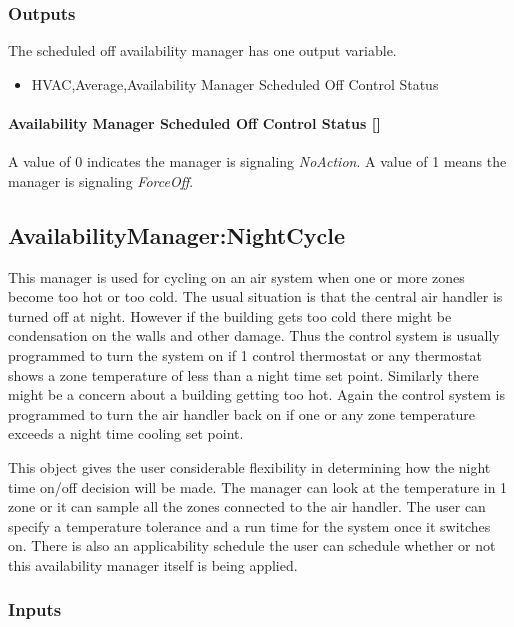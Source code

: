 \subsubsection{Outputs}\label{outputs-1-027}

The scheduled off availability manager has one output variable.

\begin{itemize}
\tightlist
\item
  HVAC,Average,Availability Manager Scheduled Off Control Status
\end{itemize}

\paragraph{Availability Manager Scheduled Off Control Status {[]}}\label{availability-manager-scheduled-off-control-status}

A value of 0 indicates the manager is signaling \emph{NoAction}. A value of 1 means the manager is signaling \emph{ForceOff}.

\subsection{AvailabilityManager:NightCycle}\label{availabilitymanagernightcycle}

This manager is used for cycling on an air system when one or more zones become too hot or too cold. The usual situation is that the central air handler is turned off at night. However if the building gets too cold there might be condensation on the walls and other damage. Thus the control system is usually programmed to turn the system on if 1 control thermostat or any thermostat shows a zone temperature of less than a night time set point. Similarly there might be a concern about a building getting too hot. Again the control system is programmed to turn the air handler back on if one or any zone temperature exceeds a night time cooling set point.

This object gives the user considerable flexibility in determining how the night time on/off decision will be made. The manager can look at the temperature in 1 zone or it can sample all the zones connected to the air handler. The user can specify a temperature tolerance and a run time for the system once it switches on. There is also an applicability schedule the user can schedule whether or not this availability manager itself is being applied.

\subsubsection{Inputs}\label{inputs-3-037}

